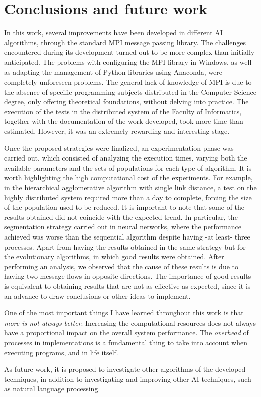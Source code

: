 \chapter*{Conclusions and future work}
\label{cap:c5_conclu_en}

	
	In this work, several improvements have been developed in different AI algorithms, through the standard MPI message passing library. The challenges encountered during its development turned out to be more complex than initially anticipated. The problems with configuring the MPI library in Windows, as well as adapting the management of Python libraries using Anaconda, were completely unforeseen problems. The general lack of knowledge of MPI is due to the absence of specific programming subjects distributed in the Computer Science degree, only offering theoretical foundations, without delving into practice. The execution of the tests in the distributed system of the Faculty of Informatics, together with the documentation of the work developed, took more time than estimated. However, it was an extremely rewarding and interesting stage.
	
	
	Once the proposed strategies were finalized, an experimentation phase was carried out, which consisted of analyzing the execution times, varying both the available parameters and the sets of populations for each type of algorithm. It is worth highlighting the high computational cost of the experiments. For example, in the hierarchical agglomerative algorithm with single link distance, a test on the highly distributed system required more than a day to complete, forcing the size of the population used to be reduced. It is important to note that some of the results obtained did not coincide with the expected trend. In particular, the segmentation strategy carried out in neural networks, where the performance achieved was worse than the sequential algorithm despite having -at least- three processes. Apart from having the results obtained in the same strategy but for the evolutionary algorithms, in which good results were obtained. After performing an analysis, we observed that the cause of these results is due to having two message flows in opposite directions. The importance of good results is equivalent to obtaining results that are not as effective as expected, since it is an advance to draw conclusions or other ideas to implement.
	
	
	One of the most important things I have learned throughout this work is that \textit{more is not always better}. Increasing the computational resources does not always have a proportional impact on the overall system performance. The \textit{overhead} of processes in implementations is a fundamental thing to take into account when executing programs, and in life itself.	
	
	
	As future work, it is proposed to investigate other algorithms of the developed techniques, in addition to investigating and improving other AI techniques, such as natural language processing.
	
	
	
	
	